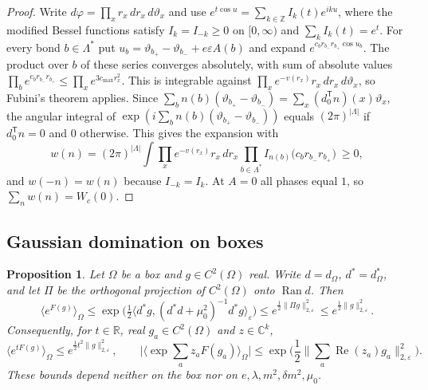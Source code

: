 \documentclass[11pt]{amsart}
\theoremstyle{plain}
\newtheorem{proposition}[theorem]{Proposition}
\theoremstyle{definition}
\theoremstyle{remark}
\numberwithin{equation}{section}
\newcommand{\R}{\mathbb{R}}
\newcommand{\Z}{\mathbb{Z}}
\newcommand{\C}{\mathbb{C}}
\newcommand{\eps}{\varepsilon}
\newcommand{\abs}[1]{\lvert #1\rvert}
\newcommand{\norm}[1]{\lVert #1\rVert}
\newcommand{\ip}[2]{\langle #1,#2\rangle}
\newcommand{\ev}[1]{\langle #1\rangle}
\newcommand{\Ran}{\operatorname{Ran}}
\DeclareMathOperator{\re}{Re}
\begin{document}
\begin{proof}
Write $d\varphi=\prod_xr_x\,dr_x\,d\vartheta_x$ and use $e^{t\cos u}=\sum_{k\in\Z}I_k(t)e^{iku}$, where the modified Bessel functions satisfy $I_k=I_{-k}\ge0$ on $[0,\infty)$ and $\sum_kI_k(t)=e^t$. For every bond $b\in\Lambda^*$ put $u_b=\vartheta_{b_+}-\vartheta_{b_-}+e\eps A(b)$ and expand $e^{c_br_{b_-}r_{b_+}\cos u_b}$. The product over $b$ of these series converges absolutely, with sum of absolute values $\prod_be^{c_br_{b_-}r_{b_+}}\le\prod_xe^{3c_{\max}r_x^2}$. This is integrable against $\prod_xe^{-v(r_x)}r_x\,dr_x\,d\vartheta_x$, so Fubini's theorem applies. Since $\sum_bn(b)(\vartheta_{b_+}-\vartheta_{b_-})=\sum_x(d_0^{\mathsf T}n)(x)\vartheta_x$, the angular integral of $\exp(i\sum_bn(b)(\vartheta_{b_+}-\vartheta_{b_-}))$ equals $(2\pi)^{\abs\Lambda}$ if $d_0^{\mathsf T}n=0$ and $0$ otherwise. This gives the expansion with
\[
w(n)=(2\pi)^{\abs\Lambda}\int\prod_xe^{-v(r_x)}r_x\,dr_x\prod_{b\in\Lambda^*}I_{n(b)}\big(c_br_{b_-}r_{b_+}\big)\ \ge0 ,
\]
and $w(-n)=w(n)$ because $I_{-k}=I_k$. At $A=0$ all phases equal $1$, so $\sum_nw(n)=W_c(0)$.
\end{proof}

\subsection{Gaussian domination on boxes}

\begin{proposition}\label{prop:GD}
Let $\Omega$ be a box and $g\in C^2(\Omega)$ real. Write $d=d_\Omega$, $d^*=d_\Omega^*$, and let $\Pi$ be the orthogonal projection of $C^2(\Omega)$ onto $\Ran d$. Then
\[
\ev{e^{F(g)}}_\Omega\le\exp\Big(\tfrac12\ip{d^*g}{(d^*d+\mu_0^2)^{-1}d^*g}_\eps\Big)\le e^{\frac12\norm{\Pi g}_{2,\eps}^2}\le e^{\frac12\norm g_{2,\eps}^2}.
\]
Consequently, for $t\in\R$, real $g_a\in C^2(\Omega)$ and $z\in\C^k$,
\[
\ev{e^{tF(g)}}_\Omega\le e^{\frac12t^2\norm g_{2,\eps}^2},\qquad\Big|\Big\langle\exp\sum_az_aF(g_a)\Big\rangle_\Omega\Big|\le\exp\Big(\frac12\Big\|\sum_a\re(z_a)g_a\Big\|_{2,\eps}^2\Big).
\] These bounds depend neither on the box nor on $e,\lambda,m^2,\delta m^2,\mu_0$.
\end{proposition}
\end{document}
